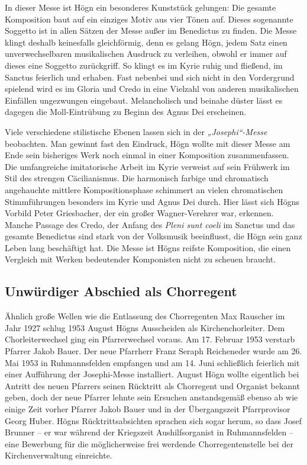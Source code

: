 \documentclass{book}
\begin{document}
In dieser Messe ist Högn ein besonderes Kunststück gelungen: Die
ge\-samte Komposition baut auf ein einziges Motiv aus vier Tönen auf.
Dieses sogenannte Soggetto ist in allen Sätzen der Messe außer im
Benedictus zu finden. Die Messe klingt deshalb keinesfalls
gleichförmig, denn es gelang Högn, jedem Satz einen unverwechselbaren
musikalischen Ausdruck zu ver\-leihen, obwohl er immer auf dieses eine
Soggetto zurückgriff. So klingt es im Kyrie ruhig und fließend, im
Sanctus feierlich und erhaben. Fast nebenbei und sich nicht in den
Vordergrund spielend wird es im Gloria und Credo in eine Vielzahl von
anderen musikalischen Einfällen ungezwungen eingebaut. Melan\-cholisch
und beinahe düster lässt es dagegen die Moll-Eintrübung zu Beginn des
Agnus Dei erscheinen.

Viele verschiedene stilistische Ebenen lassen sich in der
\textit{„Josephi“-Messe} beobachten. Man gewinnt fast den Eindruck,
Högn wollte mit dieser Messe am Ende sein bisheriges Werk noch einmal
in einer Komposition zusammen\-fassen. Die umfangreiche imitatorische
Arbeit im Kyrie verweist auf sein Frühwerk im Stil des strengen
Cäcilianismus. Die harmonisch farbige und chromatisch angehauchte
mittlere Kompositionsphase schimmert an vielen chromatischen
Stimmführungen besonders im Kyrie und Agnus Dei durch. Hier lässt sich
Högns Vorbild Peter Griesbacher, der ein großer Wagner-Ver\-ehrer war,
erkennen. Manche Passage des Credo, der Anfang des \textit{Pleni sunt
coeli} im Sanctus und das gesamte Benedictus sind stark von der
Volksmusik be\-einflusst, die Högn sein ganz Leben lang beschäftigt
hat. Die Messe ist Högns reifste Komposition, die einen Vergleich mit
Werken bedeutender Kompo\-nisten nicht zu scheuen braucht.

\subsection{Unwürdiger Abschied als Chorregent}

Ähnlich große Wellen wie die Entlassung des Chorregenten Max Rauscher im
Jahr 1927 schlug 1953 August Högns Ausscheiden als Kirchenchorleiter.
Dem Chorleiterwechsel ging ein Pfarrerwechsel voraus. Am 17. Februar
1953 ver\-starb Pfarrer Jakob Bauer. Der neue Pfarrherr Franz Seraph
Reicheneder wur\-de am 26. Mai 1953 in Ruhmannsfelden empfangen und am
14. Juni schließ\-lich feierlich mit einer Aufführung der Josephi-Messe
installiert. August Högn wollte eigentlich bei Antritt des neuen
Pfarrers seinen Rücktritt als Chorregent und Organist bekannt geben,
doch der neue Pfarrer lehnte sein Ersuchen anstandsgemäß ebenso ab wie
einige Zeit vorher Pfarrer Jakob Bauer und in der Übergangszeit
Pfarrprovisor Georg Huber. Högns Rücktrittsabsichten sprachen sich
sogar herum, so dass Josef Brunner – er war während der Kriegszeit
Aushilfsorganist in Ruhmannsfelden – eine Bewerbung für die
möglicherweise frei werdende Chorregentenstelle bei der
Kirchenverwaltung einreichte.
\end{document}

